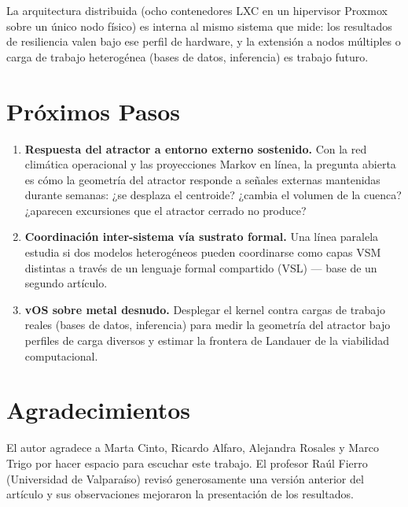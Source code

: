 \documentclass[11pt, a4paper]{article}
\newcommand{\vOS}{\textsf{vOS}}
\begin{document}
La arquitectura distribuida (ocho contenedores LXC en un hipervisor Proxmox sobre un
único nodo físico) es interna al mismo sistema que mide: los resultados de resiliencia
valen bajo ese perfil de hardware, y la extensión a nodos múltiples o carga de trabajo
heterogénea (bases de datos, inferencia) es trabajo futuro.

\section*{Próximos Pasos}

\begin{enumerate}
  \item \textbf{Respuesta del atractor a entorno externo sostenido.} Con la red
        climática operacional y las proyecciones Markov en línea, la pregunta abierta
        es cómo la geometría del atractor responde a señales externas mantenidas durante
        semanas: ¿se desplaza el centroide? ¿cambia el volumen de la cuenca?
        ¿aparecen excursiones que el atractor cerrado no produce?
  \item \textbf{Coordinación inter-sistema vía sustrato formal.} Una línea paralela
        estudia si dos modelos heterogéneos pueden coordinarse como capas VSM distintas
        a través de un lenguaje formal compartido (VSL) --- base de un segundo artículo.
  \item \textbf{\vOS{} sobre metal desnudo.} Desplegar el kernel contra cargas de
        trabajo reales (bases de datos, inferencia) para medir la geometría del
        atractor bajo perfiles de carga diversos y estimar la frontera de Landauer de
        la viabilidad computacional.
\end{enumerate}

\section*{Agradecimientos}

El autor agradece a Marta Cinto, Ricardo Alfaro, Alejandra Rosales y Marco Trigo por
hacer espacio para escuchar este trabajo. El profesor Raúl Fierro (Universidad de
Valparaíso) revisó generosamente una versión anterior del artículo y sus observaciones
mejoraron la presentación de los resultados.

\end{document}
